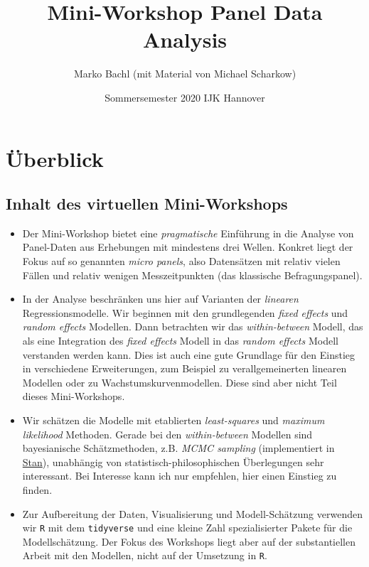 \documentclass[
]{book}
\title{Mini-Workshop Panel Data Analysis}
\author{Marko Bachl (mit Material von Michael Scharkow)}
\date{Sommersemester 2020 \textbar{} IJK Hannover}
\begin{document}
\maketitle

{
\setcounter{tocdepth}{1}
\tableofcontents
}
\hypertarget{uxfcberblick}{%
\chapter{Überblick}\label{uxfcberblick}}

\hypertarget{inhalt-des-virtuellen-mini-workshops}{%
\section{Inhalt des virtuellen Mini-Workshops}\label{inhalt-des-virtuellen-mini-workshops}}

\begin{itemize}
\item
  Der Mini-Workshop bietet eine \emph{pragmatische} Einführung in die Analyse von Panel-Daten aus Erhebungen mit mindestens drei Wellen. Konkret liegt der Fokus auf so genannten \emph{micro panels}, also Datensätzen mit relativ vielen Fällen und relativ wenigen Messzeitpunkten (das klassische Befragungspanel).
\item
  In der Analyse beschränken uns hier auf Varianten der \emph{linearen} Regressionsmodelle. Wir beginnen mit den grundlegenden \emph{fixed effects} und \emph{random effects} Modellen. Dann betrachten wir das \emph{within-between} Modell, das als eine Integration des \emph{fixed effects} Modell in das \emph{random effects} Modell verstanden werden kann. Dies ist auch eine gute Grundlage für den Einstieg in verschiedene Erweiterungen, zum Beispiel zu verallgemeinerten linearen Modellen oder zu Wachstumskurvenmodellen. Diese sind aber nicht Teil dieses Mini-Workshops.
\item
  Wir schätzen die Modelle mit etablierten \emph{least-squares} und \emph{maximum likelihood} Methoden. Gerade bei den \emph{within-between} Modellen sind bayesianische Schätzmethoden, z.B. \emph{MCMC sampling} (implementiert in \href{https://mc-stan.org/}{Stan}), unabhängig von statistisch-philosophischen Überlegungen sehr interessant. Bei Interesse kann ich nur empfehlen, hier einen Einstieg zu finden.
\item
  Zur Aufbereitung der Daten, Visualisierung und Modell-Schätzung verwenden wir \texttt{R} mit dem \texttt{tidyverse} und eine kleine Zahl spezialisierter Pakete für die Modellschätzung. Der Fokus des Workshops liegt aber auf der substantiellen Arbeit mit den Modellen, nicht auf der Umsetzung in \texttt{R}.
\end{itemize}
\end{document}
